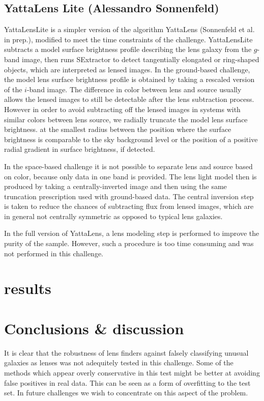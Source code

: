 \documentclass[useAMS,usenatbib]{mn2e}
\begin{document}
\subsection{YattaLens Lite (Alessandro Sonnenfeld)}
YattaLensLite is a simpler version of the algorithm YattaLens (Sonnenfeld et al. in prep.), modified to meet the time constraints of the challenge.
YattaLensLite subtracts a model surface brightness profile describing the lens galaxy from the $g$-band image, then runs SExtractor to detect tangentially elongated or ring-shaped objects, which are interpreted as lensed images.
In the ground-based challenge, the model lens surface brightness profile is obtained by taking a rescaled version of the $i$-band image.
The difference in color between lens and source usually allows the lensed images to still be detectable after the lens subtraction process.
However in order to avoid subtracting off the lensed images in systems with similar colors between lens source, we radially truncate the model lens surface brightness.
at the smallest radius between the position where the surface brightness is comparable to the sky background level or the position of a positive radial gradient in surface brightness, if detected.

In the space-based challenge it is not possible to separate lens and source based on color, because only data in one band is provided. The lens light model then is produced by taking a centrally-inverted image and then using the same truncation prescription used with ground-based data. The central inversion step is taken to reduce the chances of subtracting flux from lensed images, which are in general not centrally symmetric as opposed to typical lens galaxies.

In the full version of YattaLens, a lens modeling step is performed to improve the purity of the sample. However, such a procedure is too time consuming and was not performed in this challenge.

\section{results}

\section{Conclusions \& discussion}

It is clear that the robustness of lens finders against falsely classifying unusual galaxies as lenses was not adequitely tested in this challenge.  Some of the methods which appear overly conservative in this test might be better at avoiding false positives in real data.  This can be seen as a form of overfitting to the test set.
In future challenges we wish to concentrate on this aspect of the problem.
\end{document}
